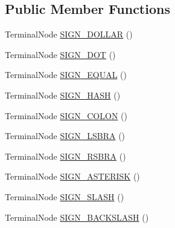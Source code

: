 \subsection*{Public Member Functions}
\begin{DoxyCompactItemize}
\item 
Terminal\+Node \hyperlink{classgov_1_1nasa_1_1jpf_1_1inspector_1_1client_1_1parser_1_1_console_grammar_parser_1_1_signs_context_a5bcb7caad2b37c79efe13cd6c4b8a9cb}{S\+I\+G\+N\+\_\+\+D\+O\+L\+L\+AR} ()
\item 
Terminal\+Node \hyperlink{classgov_1_1nasa_1_1jpf_1_1inspector_1_1client_1_1parser_1_1_console_grammar_parser_1_1_signs_context_a7ad4ade555df76a03472649991c08f22}{S\+I\+G\+N\+\_\+\+D\+OT} ()
\item 
Terminal\+Node \hyperlink{classgov_1_1nasa_1_1jpf_1_1inspector_1_1client_1_1parser_1_1_console_grammar_parser_1_1_signs_context_a16e398a19a619ca6a177e2ec2d4d8c4a}{S\+I\+G\+N\+\_\+\+E\+Q\+U\+AL} ()
\item 
Terminal\+Node \hyperlink{classgov_1_1nasa_1_1jpf_1_1inspector_1_1client_1_1parser_1_1_console_grammar_parser_1_1_signs_context_a5620a2ea7c6fc1d842196ff31e932929}{S\+I\+G\+N\+\_\+\+H\+A\+SH} ()
\item 
Terminal\+Node \hyperlink{classgov_1_1nasa_1_1jpf_1_1inspector_1_1client_1_1parser_1_1_console_grammar_parser_1_1_signs_context_a8528ab7034d87b03305536882942ffee}{S\+I\+G\+N\+\_\+\+C\+O\+L\+ON} ()
\item 
Terminal\+Node \hyperlink{classgov_1_1nasa_1_1jpf_1_1inspector_1_1client_1_1parser_1_1_console_grammar_parser_1_1_signs_context_aa3f560d693d08b3248ef3f0397f2bdd5}{S\+I\+G\+N\+\_\+\+L\+S\+B\+RA} ()
\item 
Terminal\+Node \hyperlink{classgov_1_1nasa_1_1jpf_1_1inspector_1_1client_1_1parser_1_1_console_grammar_parser_1_1_signs_context_a964b9d6f4add66d20c3eb3074e4db26c}{S\+I\+G\+N\+\_\+\+R\+S\+B\+RA} ()
\item 
Terminal\+Node \hyperlink{classgov_1_1nasa_1_1jpf_1_1inspector_1_1client_1_1parser_1_1_console_grammar_parser_1_1_signs_context_a977a524b1f390edf53b74ce17998a044}{S\+I\+G\+N\+\_\+\+A\+S\+T\+E\+R\+I\+SK} ()
\item 
Terminal\+Node \hyperlink{classgov_1_1nasa_1_1jpf_1_1inspector_1_1client_1_1parser_1_1_console_grammar_parser_1_1_signs_context_a89948e9f6e45970efabe229840c381c0}{S\+I\+G\+N\+\_\+\+S\+L\+A\+SH} ()
\item 
Terminal\+Node \hyperlink{classgov_1_1nasa_1_1jpf_1_1inspector_1_1client_1_1parser_1_1_console_grammar_parser_1_1_signs_context_a79ab1579acdae4119d3d3fe373d5ab89}{S\+I\+G\+N\+\_\+\+B\+A\+C\+K\+S\+L\+A\+SH} ()

\end{DoxyCompactItemize}

